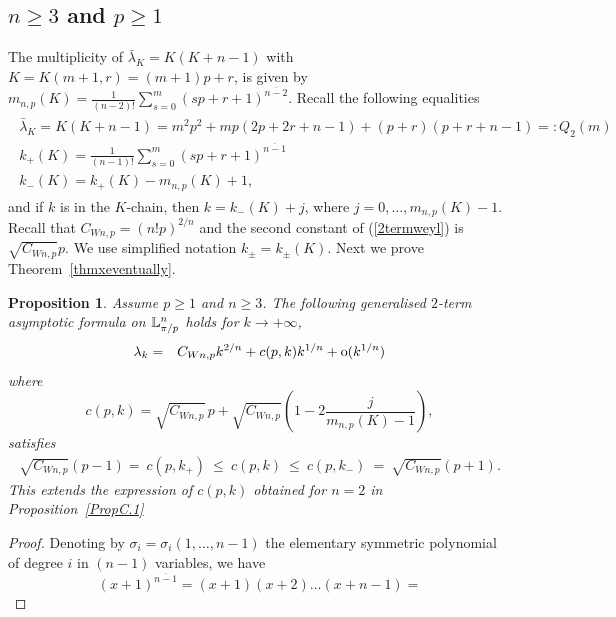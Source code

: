 \documentclass[11pt,a4paper,times]{amsart}
\theoremstyle{plain}
\newtheorem{proposition}{Proposition}[section]
\theoremstyle{definition}
\numberwithin{equation}{section}
\newcommand{\so}{{\rm o}}
\newcommand{\Cwnp}[2]{ C_{W #1,#2}}
\newcommand{\luned}[2]{\raisebox{0.5pt}{${}$}\mathbb{L}^{#1}_{\pi/#2}}
\newcommand{\txtg}{\textcolor{green}}
\begin{document}
{\subsection{$n\geq 3$ and {$p\geq 1$}}\label{C6.2}
  The multiplicity of  $\bar{\lambda}_K=K(K+n-1)$ with  $K=K(m+1,r)=(m+1)p+r$, is given by
  $ m_{n,p}(K)=\frac{1}{(n-2)!}\sum_{s=0}^m(sp +r+1)^{\overline{n-2}}$. Recall the following equalities
 \begin{gather*}\begin{array}{l}
 \bar{\lambda}_K= K(K+n-1)=m^2p^2+mp( 2p+2r+n-1)+(p+r)(p+r+n-1)=: Q_2(m)\\
 k_+(K)=\frac{1}{(n-1)!}\sum_{s=0}^m(sp +r+1)^{\overline{n-1}}\\
 k_-(K)= k_+(K)-m_{n,p}(K)+1,
 \end{array}
 \end{gather*}
and  if $k$ is in the $K$-chain, then  $k= k_-(K)+ j$, where $j=0, \ldots, m_{n,p}(K)-1$. Recall that
 $\Cwnp{n}{p}=(n!p)^{2/n}$ and the second constant of (\ref{2termweyl}) is $\sqrt{\Cwnp{n}{p}}p$. We use simplified notation $k_{\pm}=k_{\pm}(K)$. Next we prove Theorem~\ref{thmxeventually}.
%
\begin{proposition} \label{PropC3} Assume $p\geq 1$ and $n\geq 3$.
The following generalised $2$-term asymptotic formula on $\luned{n}{p}$ holds for $k\to +\infty$,
\begin{eqnarray}\label{o-3term}
 \lambda_k &=&\Cwnp{n}{p}k^{2/n}+  c(p,k)k^{1/n} +\so(k^{1/n})
\end{eqnarray}
 where
 \[c(p,k)=\sqrt{\Cwnp{n}{p}}\, p+ \sqrt{\Cwnp{n}{p}}\left( 1-2\frac{j}{m_{n,p}(K)-1}\right),\]
satisfies
\begin{gather*}
\sqrt{\Cwnp{n}{p}}(p-1)=~c(p,k_+)~\leq ~ c(p,k)~\leq ~  c(p,k_-)~=~\sqrt{\Cwnp{n}{p}}(p+1).
\end{gather*}
This extends the expression of $c(p,k)$ obtained for $n=2$ in Proposition~\ref{PropC.1}
 \end{proposition}
 \begin{proof}
Denoting by $\sigma_i=\sigma_i(1,\ldots, n-1)$ the elementary symmetric polynomial of degree $i$ in $(n-1)$ variables,  we have
\[
(x+1)^{\overline{n-1}}=(x+1)(x+2)\ldots (x+n-1)=
\]
\end{proof}}
\end{document}
